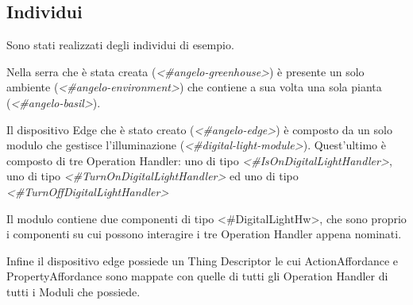 \subsection{Individui}
Sono stati realizzati degli individui di esempio.

\noindent Nella serra che è stata creata (\textit{<\#angelo-greenhouse>}) è presente un solo ambiente (\textit{<\#angelo-environment>}) che contiene a sua volta una sola pianta (\textit{<\#angelo-basil>}).

\noindent Il dispositivo Edge che è stato creato (\textit{<\#angelo-edge>}) è composto da un solo modulo che gestisce l'illuminazione (\textit{<\#digital-light-module>}). Quest'ultimo è composto di tre Operation Handler: uno di tipo \textit{<\#IsOnDigitalLightHandler>}, uno di tipo \textit{<\#TurnOnDigitalLightHandler>} ed uno di tipo \textit{<\#TurnOffDigitalLightHandler>}

\noindent Il modulo contiene due componenti di tipo <\#DigitalLightHw>, che sono proprio i componenti su cui possono interagire i tre Operation Handler appena nominati.

\noindent Infine il dispositivo edge possiede un Thing Descriptor le cui ActionAffordance e PropertyAffordance sono mappate con quelle di tutti gli Operation Handler di tutti i Moduli che possiede.
